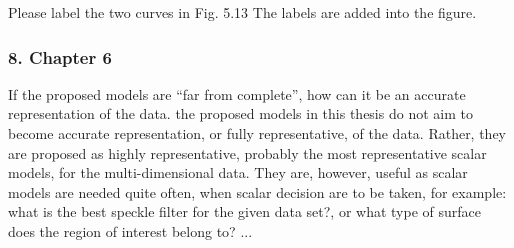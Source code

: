 \replyToComment
    {Please label the two curves in Fig. 5.13}
    {The labels are added into the figure.}    
    
%
%
%
%

\subsubsection*{8. Chapter 6}

\replyToComment
    {If the proposed models are ``far from complete'', how can it be an accurate representation of the data.}
    {the proposed models in this thesis do not aim to become accurate representation, or fully representative, of the data.
Rather, they are proposed as highly representative, probably the most representative scalar models, for the multi-dimensional data.
They are, however, useful as scalar models are needed quite often, when scalar decision are to be taken,
  for example: what is the best speckle filter for the given data set?, or what type of surface does the region of interest belong to? ...
}


